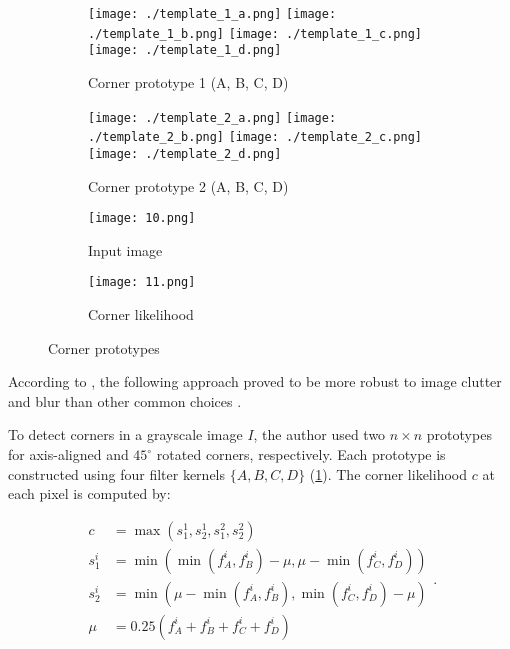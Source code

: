 \begin{figure}[h]
	\centering

	\begin{subfigure}{0.45\textwidth}
		\centering
		\begin{minipage}{\textwidth}
			\texttt{[image: ./template\_1\_a.png]}
			\texttt{[image: ./template\_1\_b.png]}
			\texttt{[image: ./template\_1\_c.png]}
			\texttt{[image: ./template\_1\_d.png]}
		\end{minipage}
		\caption{Corner prototype 1 (A, B, C, D)}
	\end{subfigure}
	\hfill
	\begin{subfigure}{0.45\textwidth}
		\centering
		\begin{minipage}{\textwidth}
			\texttt{[image: ./template\_2\_a.png]}
			\texttt{[image: ./template\_2\_b.png]}
			\texttt{[image: ./template\_2\_c.png]}
			\texttt{[image: ./template\_2\_d.png]}
		\end{minipage}
		\caption{Corner prototype 2 (A, B, C, D)}
	\end{subfigure}
	\begin{subfigure}{0.3\linewidth}
		\texttt{[image: 10.png]}
		\caption{Input image}
	\end{subfigure}
	\begin{subfigure}{0.3\linewidth}
		\texttt{[image: 11.png]}
		\caption{Corner likelihood}
	\end{subfigure}

	\caption{Corner prototypes \citep{geigerAutomaticCameraRange2012}}
	\label{fig:corner_prototypes}
\end{figure}

According to \cite{geigerAutomaticCameraRange2012}, the following approach proved to be
more robust to image clutter and blur than other common choices
\citep{harrisCombinedCornerEdge1988, shiGoodFeaturesTrack2000}.

To detect corners in a grayscale image $I$, the author used two $n \times n$ prototypes
for axis-aligned and $45^{\circ}$ rotated corners, respectively.
Each prototype
is constructed using four filter kernels $\{A, B, C, D\}$ (\cref{fig:corner_prototypes}). The corner likelihood
$c$ at each pixel is computed by:

\begin{equation}
	\begin{aligned}
		c     & =\max \left(s_1^1, s_2^1, s_1^2, s_2^2\right)                                             \\
		s_1^i & =\min \left(\min \left(f_A^i, f_B^i\right)-\mu, \mu-\min \left(f_C^i, f_D^i\right)\right) \\
		s_2^i & =\min \left(\mu-\min \left(f_A^i, f_B^i\right), \min \left(f_C^i, f_D^i\right)-\mu\right) \\
		\mu   & =0.25\left(f_A^i+f_B^i+f_C^i+f_D^i\right)
	\end{aligned}.
\end{equation}

